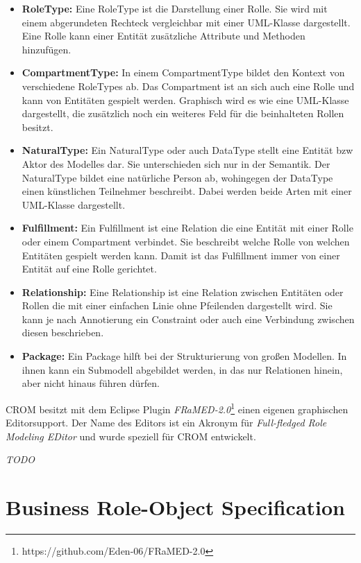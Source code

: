 \begin{itemize}
    \item \textbf{RoleType:}
    Eine RoleType ist die Darstellung einer Rolle.
    Sie wird mit einem abgerundeten Rechteck vergleichbar mit einer UML-Klasse dargestellt.
    Eine Rolle kann einer Entität zusätzliche Attribute und Methoden hinzufügen.
    \item \textbf{CompartmentType:}
    In einem CompartmentType bildet den Kontext von verschiedene RoleTypes ab.
    Das Compartment ist an sich auch eine Rolle und kann von Entitäten gespielt werden.
    Graphisch wird es wie eine UML-Klasse dargestellt, die zusätzlich noch ein weiteres Feld für die beinhalteten Rollen besitzt.
    \item \textbf{NaturalType:}
    Ein NaturalType oder auch DataType stellt eine Entität bzw Aktor des Modelles dar.
    Sie unterschieden sich nur in der Semantik.
    Der NaturalType bildet eine natürliche Person ab, wohingegen der DataType einen künstlichen Teilnehmer beschreibt.
    Dabei werden beide Arten mit einer UML-Klasse dargestellt. 
    \item \textbf{Fulfillment:}
    Ein Fulfillment ist eine Relation die eine Entität mit einer Rolle oder einem Compartment verbindet.
    Sie beschreibt welche Rolle von welchen Entitäten gespielt werden kann.
    Damit ist das Fulfillment immer von einer Entität auf eine Rolle gerichtet.
    \item \textbf{Relationship:}
    Eine Relationship ist eine Relation zwischen Entitäten oder Rollen die mit einer einfachen Linie ohne Pfeilenden dargestellt wird.
    Sie kann je nach Annotierung ein Constraint oder auch eine Verbindung zwischen diesen beschrieben.
    \item \textbf{Package:}
    Ein Package hilft bei der Strukturierung von großen Modellen.
    In ihnen kann ein Submodell abgebildet werden, in das nur Relationen hinein, aber nicht hinaus führen dürfen.
\end{itemize}

CROM besitzt mit dem Eclipse Plugin \emph{FRaMED-2.0}\footnote{https://github.com/Eden-06/FRaMED-2.0} einen eigenen graphischen Editorsupport.
Der Name des Editors ist ein Akronym für \emph{Full-fledged Role Modeling EDitor} und wurde speziell für CROM entwickelt.

\textit{TODO}

\section{Business Role-Object Specification}

